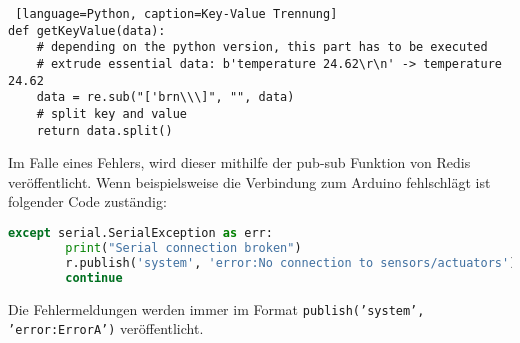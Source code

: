 \begin{lstlisting} [language=Python, caption=Key-Value Trennung]
def getKeyValue(data):
    # depending on the python version, this part has to be executed
    # extrude essential data: b'temperature 24.62\r\n' -> temperature 24.62
    data = re.sub("['brn\\\]", "", data)
    # split key and value
    return data.split()
\end{lstlisting}

\newpage
Im Falle eines Fehlers, wird dieser mithilfe der pub-sub Funktion von Redis veröffentlicht. Wenn beispielsweise die Verbindung zum Arduino fehlschlägt ist folgender Code zuständig:
\begin{lstlisting}[language=Python]
    except serial.SerialException as err:
        print("Serial connection broken")
        r.publish('system', 'error:No connection to sensors/actuators')
        continue
\end{lstlisting}
Die Fehlermeldungen werden immer im Format \texttt{publish('system', 'error:ErrorA')} veröffentlicht.
\newpage